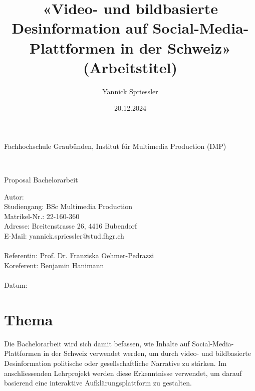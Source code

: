 \documentclass[12pt,a4paper]{article}        %
\title{«Video- und bildbasierte Desinformation auf Social-Media-Plattformen in der Schweiz» (Arbeitstitel)}        %
\author{Yannick Spriessler}     %
\date{20.12.2024}     %
\begin{document}
\begin{titlingpage} %
  \begin{center}
    \begin{large}
      Fachhochschule Graubünden, Institut für Multimedia Production (IMP)\\ %
    \end{large}
    \vspace{2cm} %
    \begin{LARGE}
      \textbf{\thetitle} \\
    \end{LARGE}
    \vspace{1cm}
    \begin{large}
      Proposal Bachelorarbeit\\
    \end{large}
    \vspace{5cm} %
    Autor: \theauthor \\
    Studiengang: BSc Multimedia Production \\
    Matrikel-Nr.: 22-160-360 \\
    Adresse: Breitenstrasse 26, 4416 Bubendorf \\
    E-Mail: yannick.spriessler@stud.fhgr.ch \\ \\
    Referentin: Prof. Dr. Franziska Oehmer-Pedrazzi \\
    Koreferent: Benjamin Hanimann \\ \\
    Datum: \thedate
  \end{center}
\end{titlingpage}
\thispagestyle{empty}
\setcounter{page}{0}    %
\tableofcontents        %
\pagebreak

\section{Thema}
Die Bachelorarbeit wird sich damit befassen, wie Inhalte auf Social-Media-Plattformen in der Schweiz verwendet werden, um durch video- und bildbasierte Desinformation politische oder gesellschaftliche Narrative zu stärken. Im anschliessenden Lehrprojekt werden diese Erkenntnisse verwendet, um darauf basierend eine interaktive Aufklärungsplattform zu gestalten.
\end{document}
